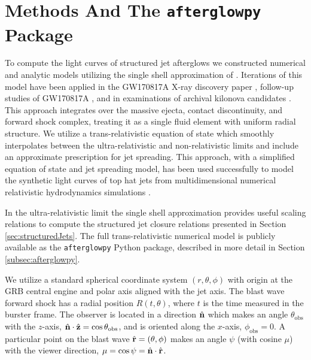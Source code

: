 \documentclass[twocolumn]{aastex62}
\newcommand{\gwbns}{GW170817A}
\newcommand{\afterglowpy}{{\tt afterglowpy}}
\newcommand{\thobs}{\ensuremath{\theta_{\mathrm{obs}}}}
\newcommand{\phobs}{\ensuremath{\phi_{\mathrm{obs}}}}
\begin{document}
%
%


\section{Methods And The \afterglowpy{} Package}\label{sec:numerical}

To compute the light curves of structured jet afterglows we constructed numerical and analytic models utilizing the single shell approximation of \cite{van-Eerten:2010aa, van-Eerten:2018ab}.  Iterations of this model have been applied in the \gwbns{} X-ray discovery paper \citep{Troja:2017aa}, follow-up studies of \gwbns{} \citep{Troja:2018aa, Piro:2019aa, Troja:2019ab}, and in examinations of archival kilonova candidates \citep{Troja:2018ab, Troja:2019aa}. This approach integrates over the massive ejecta, contact discontinuity, and forward shock complex, treating it as a single fluid element with uniform radial structure. We utilize a trans-relativistic equation of state which smoothly interpolates between the ultra-relativistic and non-relativistic limits \citep{van-Eerten:2013ab, Nava:2013aa} and include an approximate prescription for jet spreading.  This approach, with a simplified equation of state and jet spreading model, has been used successfully to model the synthetic light curves of top hat jets from multidimensional numerical relativistic hydrodynamics simulations \citep{van-Eerten:2010aa}.

In the ultra-relativistic limit the single shell approximation provides useful scaling relations to compute the structured jet closure relations presented in Section \ref{sec:structuredJets}.  The full trans-relativistic numerical model is publicly available as the \afterglowpy{} Python package, described in more detail in Section \ref{subsec:afterglowpy}.

We utilize a standard spherical coordinate system $(r, \theta, \phi)$ with origin at the GRB central engine and polar axis aligned with the jet axis.  The blast wave forward shock has a radial position $R(t, \theta)$, where $t$ is the time measured in the burster frame. The observer is located in a direction $\hat{\bf n}$ which makes an angle $\thobs$ with the $z$-axis, $\hat{\bf n} \cdot \hat{\bf z} = \cos \thobs$, and is oriented along the $x$-axis, $\phobs = 0$.  A particular point on the blast wave $\hat{\bf r} = (\theta, \phi)$ makes an angle $\psi$ (with cosine $\mu$) with the viewer direction, $\mu = \cos \psi = \hat{\bf n} \cdot \hat{\bf r}$.
\end{document}
